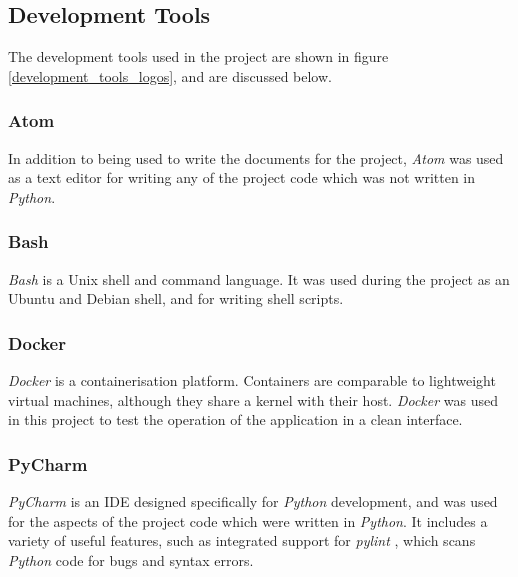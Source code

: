 \subsection{Development Tools}
The development tools used in the project are shown in figure \ref{development_tools_logos}, and are discussed below.

\subsubsection{Atom \cite{atom}}
In addition to being used to write the documents for the project, \textit{Atom} was used as a text editor for writing any of the project code which was not written in \textit{Python}.

\subsubsection{Bash \cite{bash}}
\textit{Bash} is a Unix shell and command language. It was used during the project as an Ubuntu and Debian shell, and for writing shell scripts.

\subsubsection{Docker \cite{docker}}
\textit{Docker} is a containerisation platform. Containers are comparable to lightweight virtual machines, although they share a kernel with their host. \textit{Docker} was used in this project to test the operation of the application in a clean interface.

\subsubsection{PyCharm \cite{pycharm}}
\textit{PyCharm} is an IDE designed specifically for \textit{Python} development, and was used for the aspects of the project code which were written in \textit{Python}. It includes a variety of useful features, such as integrated support for \textit{pylint} \cite{pylint}, which scans \textit{Python} code for bugs and syntax errors.

